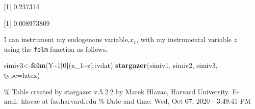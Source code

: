 \documentclass[
]{article}
\newenvironment{Shaded}{\begin{snugshade}}{\end{snugshade}}
\newcommand{\CommentTok}[1]{\textcolor[rgb]{0.56,0.35,0.01}{\textit{#1}}}
\newcommand{\DataTypeTok}[1]{\textcolor[rgb]{0.13,0.29,0.53}{#1}}
\newcommand{\DecValTok}[1]{\textcolor[rgb]{0.00,0.00,0.81}{#1}}
\newcommand{\KeywordTok}[1]{\textcolor[rgb]{0.13,0.29,0.53}{\textbf{#1}}}
\newcommand{\NormalTok}[1]{#1}
\newcommand{\OperatorTok}[1]{\textcolor[rgb]{0.81,0.36,0.00}{\textbf{#1}}}
\newcommand{\StringTok}[1]{\textcolor[rgb]{0.31,0.60,0.02}{#1}}
\begin{document}
\begin{Shaded}
\end{Shaded}

{[}1{]} 0.237314

\begin{Shaded}
\end{Shaded}

{[}1{]} 0.008973809

I can instrument my endogenous variable,\(x_1\), with my instrumental
variable \(z\) using the \texttt{felm} function as follows.

\begin{Shaded}
\begin{Highlighting}[]
\NormalTok{simiv3\textless{}{-}}\KeywordTok{felm}\NormalTok{(Y}\OperatorTok{\textasciitilde{}}\DecValTok{1}\OperatorTok{|}\DecValTok{0}\OperatorTok{|}\NormalTok{(x\_}\DecValTok{1}\OperatorTok{\textasciitilde{}}\NormalTok{z),ivdat)}
\KeywordTok{stargazer}\NormalTok{(simiv1, simiv2, simiv3,  }\DataTypeTok{type=}\StringTok{\textquotesingle{}latex\textquotesingle{}}\NormalTok{)}
\end{Highlighting}
\end{Shaded}

\% Table created by stargazer v.5.2.2 by Marek Hlavac, Harvard
University. E-mail: hlavac at fas.harvard.edu \% Date and time: Wed, Oct
07, 2020 - 3:49:41 PM
\end{document}
